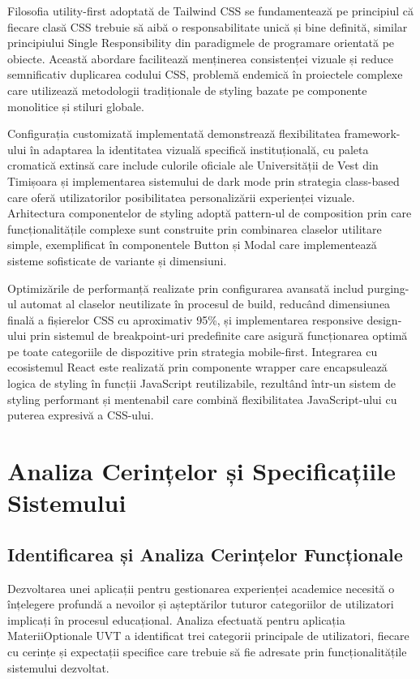 \documentclass[12pt,a4paper]{report}
\begin{document}
Filosofia utility-first adoptată de Tailwind CSS se fundamentează pe principiul că fiecare clasă CSS trebuie să aibă o responsabilitate unică și bine definită, similar principiului Single Responsibility din paradigmele de programare orientată pe obiecte. Această abordare facilitează menținerea consistenței vizuale și reduce semnificativ duplicarea codului CSS, problemă endemică în proiectele complexe care utilizează metodologii tradiționale de styling bazate pe componente monolitice și stiluri globale.

Configurația customizată implementată demonstrează flexibilitatea framework-ului în adaptarea la identitatea vizuală specifică instituțională, cu paleta cromatică extinsă care include culorile oficiale ale Universității de Vest din Timișoara și implementarea sistemului de dark mode prin strategia class-based care oferă utilizatorilor posibilitatea personalizării experienței vizuale. Arhitectura componentelor de styling adoptă pattern-ul de composition prin care funcționalitățile complexe sunt construite prin combinarea claselor utilitare simple, exemplificat în componentele Button și Modal care implementează sisteme sofisticate de variante și dimensiuni.

Optimizările de performanță realizate prin configurarea avansată includ purging-ul automat al claselor neutilizate în procesul de build, reducând dimensiunea finală a fișierelor CSS cu aproximativ 95\%, și implementarea responsive design-ului prin sistemul de breakpoint-uri predefinite care asigură funcționarea optimă pe toate categoriile de dispozitive prin strategia mobile-first. Integrarea cu ecosistemul React este realizată prin componente wrapper care encapsulează logica de styling în funcții JavaScript reutilizabile, rezultând într-un sistem de styling performant și mentenabil care combină flexibilitatea JavaScript-ului cu puterea expresivă a CSS-ului.


\chapter{Analiza Cerințelor și Specificațiile Sistemului}

\section{Identificarea și Analiza Cerințelor Funcționale}

Dezvoltarea unei aplicații pentru gestionarea experienței academice necesită o înțelegere profundă a nevoilor și așteptărilor tuturor categoriilor de utilizatori implicați în procesul educațional. Analiza efectuată pentru aplicația MateriiOptionale UVT a identificat trei categorii principale de utilizatori, fiecare cu cerințe și expectații specifice care trebuie să fie adresate prin funcționalitățile sistemului dezvoltat.
\end{document}
